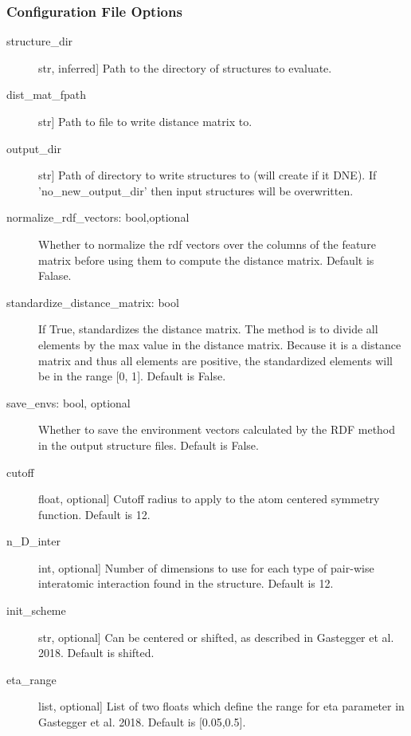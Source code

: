 \documentclass[letterpaper,10pt,english]{sphinxmanual}
\begin{document}
\begin{fulllineitems}
\begin{fulllineitems}
\subsubsection*{Configuration File Options}
\begin{description}
\item[{structure\_dir}] \leavevmode{[}str, inferred{]}
Path to the directory of structures to evaluate.

\item[{dist\_mat\_fpath}] \leavevmode{[}str{]}
Path to file to write distance matrix to.

\item[{output\_dir}] \leavevmode{[}str{]}
Path of directory to write structures to (will create if it DNE).
If 'no\_new\_output\_dir' then input structures will be overwritten.

\item[{normalize\_rdf\_vectors: bool,optional}] \leavevmode
Whether to normalize the rdf vectors over the columns of the
feature matrix before using them to compute the distance matrix.
Default is Falase.

\item[{standardize\_distance\_matrix: bool}] \leavevmode
If True, standardizes the distance matrix. The method is to divide
all elements by the max value in the distance matrix.
Because it is a distance matrix and thus all elements are positive,
the standardized elements will be in the range {[}0, 1{]}.
Default is False.

\item[{save\_envs: bool, optional}] \leavevmode
Whether to save the environment vectors calculated by the RDF
method in the output structure files. Default is False.

\item[{cutoff}] \leavevmode{[}float, optional{]}
Cutoff radius to apply to the atom centered symmetry function.
Default is 12.

\item[{n\_D\_inter}] \leavevmode{[}int, optional{]}
Number of dimensions to use for each type of pair-wise
interatomic interaction found in the structure. Default is 12.

\item[{init\_scheme}] \leavevmode{[}str, optional{]}
Can be centered or shifted, as described in Gastegger et al. 2018.
Default is shifted.

\item[{eta\_range}] \leavevmode{[}list, optional{]}
List of two floats which define the range for eta parameter in
Gastegger et al. 2018. Default is {[}0.05,0.5{]}.


\end{description}
\end{fulllineitems}
\end{fulllineitems}
\end{document}
